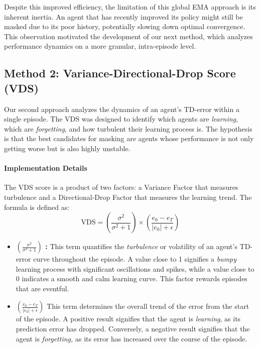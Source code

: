 Despite this improved efficiency, the limitation of this global EMA approach is its inherent inertia. An agent that has recently improved its policy might still be masked due to its poor history, potentially slowing down optimal convergence. This observation motivated the development of our next method, which analyzes performance dynamics on a more granular, intra-episode level.


\subsection{Method 2: Variance-Directional-Drop Score (VDS)}
\label{subsec:vds_method}

Our second approach analyzes the dynamics of an agent's TD-error within a single episode. The VDS was designed to identify which agents are \textit{learning}, which are \textit{forgetting}, and how turbulent their learning process is. The hypothesis is that the best candidates for masking are agents whose performance is not only getting worse but is also highly unstable.

\paragraph{Implementation Details}
The VDS score is a product of two factors: a Variance Factor that measures turbulence and a Directional-Drop Factor that measures the learning trend. The formula is defined as:
\begin{equation}
    \text{VDS} = \left(\frac{\sigma^2}{\sigma^2 + 1}\right) \times \left(\frac{e_0 - e_T}{|e_0| + \epsilon}\right)
\label{eq:vds}
\end{equation}

\begin{itemize}
\item \textbf{$\left(\frac{\sigma^2}{\sigma^2 + 1}\right)$ : } This term quantifies the \textit{turbulence} or volatility of an agent's TD-error curve throughout the episode. A value close to 1 signifies a \textit{bumpy} learning process with significant oscillations and spikes, while a value close to 0 indicates a smooth and calm learning curve. This factor rewards episodes that are eventful.
\item \textbf{$\left(\frac{e_0 - e_T}{|e_0| + \epsilon}\right)$} This term determines the overall trend of the error from the start of the episode. A positive result signifies that the agent is \textit{learning}, as its prediction error has dropped. Conversely, a negative result signifies that the agent is \textit{forgetting,} as its error has increased over the course of the episode.
\end{itemize}

